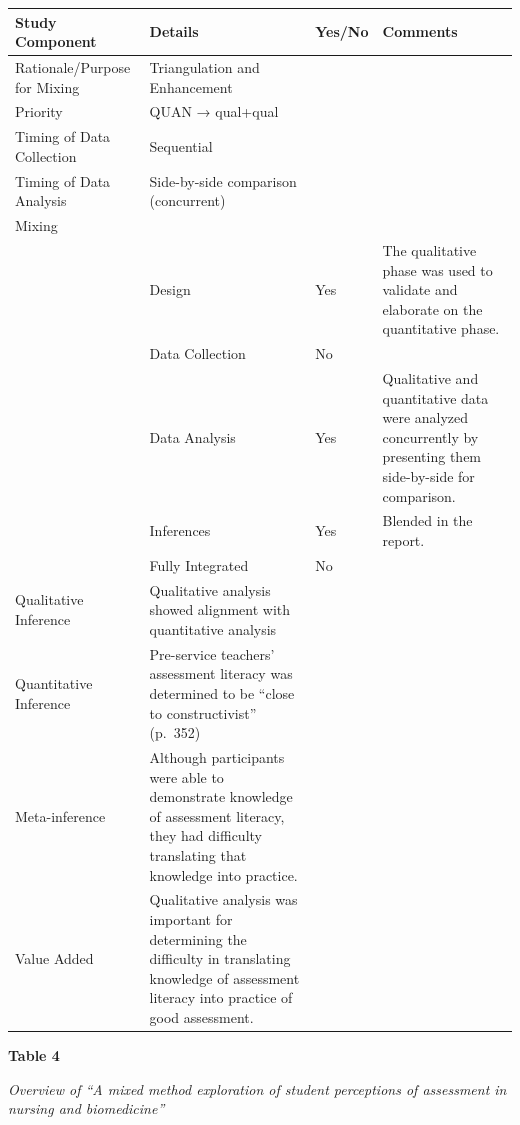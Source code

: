 \documentclass[
]{book}
\begin{document}
\begin{longtable}[]{@{}
  >{\raggedright\arraybackslash}p{}
  >{\raggedright\arraybackslash}p{}
  >{\raggedright\arraybackslash}p{}
  >{\raggedright\arraybackslash}p{}@{}}
\toprule
Study Component & Details & Yes/No & Comments \\
\midrule
\endhead
Rationale/Purpose for Mixing & Triangulation and Enhancement & & \\
Priority & QUAN → qual+qual & & \\
Timing of Data Collection & Sequential & & \\
Timing of Data Analysis & Side-by-side comparison (concurrent) & & \\
Mixing & & & \\
& Design & Yes & The qualitative phase was used to validate and elaborate on the quantitative phase. \\
& Data Collection & No & \\
& Data Analysis & Yes & Qualitative and quantitative data were analyzed concurrently by presenting them side-by-side for comparison. \\
& Inferences & Yes & Blended in the report. \\
& Fully Integrated & No & \\
Qualitative Inference & Qualitative analysis showed alignment with quantitative analysis & & \\
Quantitative Inference & Pre-service teachers' assessment literacy was determined to be ``close to constructivist'' (p.~352) & & \\
Meta-inference & Although participants were able to demonstrate knowledge of assessment literacy, they had difficulty translating that knowledge into practice. & & \\
Value Added & Qualitative analysis was important for determining the difficulty in translating knowledge of assessment literacy into practice of good assessment. & & \\
\bottomrule
\end{longtable}

\textbf{Table 4}

\emph{Overview of ``A mixed method exploration of student perceptions of assessment in nursing and biomedicine'' \citep{garveyMixedMethodExploration2021}}
\end{document}
